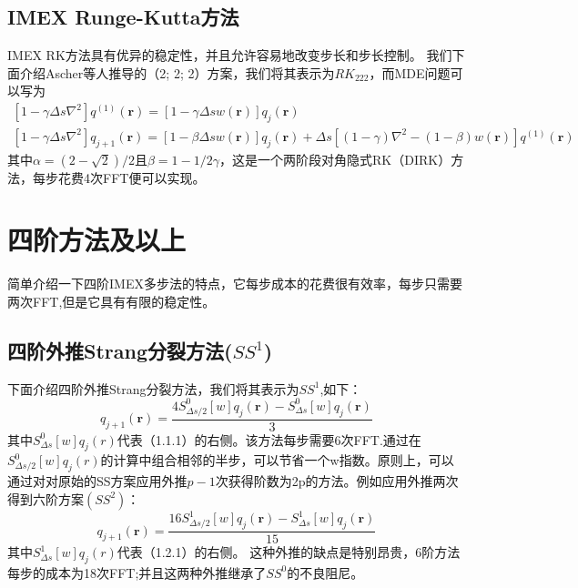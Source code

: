 \subsection{IMEX Runge-Kutta方法}
IMEX RK方法具有优异的稳定性，并且允许容易地改变步长和步长控制。
我们下面介绍Ascher等人推导的（2; 2; 2）方案，我们将其表示为$RK_{222}$，而MDE问题可以写为
\begin{equation}
\begin{array}{l}{\left[1-\gamma \Delta s \nabla^{2}\right] q^{(1)}(\mathbf{r})=[1-\gamma \Delta s w(\mathbf{r})] q_{j}(\mathbf{r})} \\ {\left[1-\gamma \Delta s \nabla^{2}\right] q_{j+1}(\mathbf{r})=[1-\beta \Delta s w(\mathbf{r})] q_{j}(\mathbf{r})+\Delta s\left[(1-\gamma) \nabla^{2}-(1-\beta) w(\mathbf{r})\right] q^{(1)}(\mathbf{r})}\end{array}
\end{equation}
其中$\alpha=(2-\sqrt{2})/2$且$\beta=1-1/2\gamma$，这是一个两阶段对角隐式RK（DIRK）方法，每步花费4次FFT便可以实现。



\section{四阶方法及以上}
简单介绍一下四阶IMEX多步法的特点，它每步成本的花费很有效率，每步只需要两次FFT,但是它具有有限的稳定性。

\subsection{四阶外推Strang分裂方法($SS^1$)}
下面介绍四阶外推Strang分裂方法，我们将其表示为$SS^1$,如下：
\begin{equation}
q_{j+1}(\mathbf{r})=\frac{4 S_{\Delta s / 2}^{0}[w] q_{j}(\mathbf{r})-S_{\Delta s}^{0}[w] q_{j}(\mathbf{r})}{3}
\end{equation}
其中$S_{\Delta s}^0[w]q_{j}(r)$代表（1.1.1）的右侧。该方法每步需要6次FFT.通过在$S_{\Delta s/2}^0[w]q_{j}(r)$的计算中组合相邻的半步，可以节省一个w指数。原则上，可以通过对对原始的SS方案应用外推$p-1$次获得阶数为2p的方法。例如应用外推两次得到六阶方案$(SS^2)$：
\begin{equation}
q_{j+1}(\mathbf{r})=\frac{16 S_{\Delta s / 2}^{1}[w] q_{j}(\mathbf{r})-S_{\Delta s}^{1}[w] q_{j}(\mathbf{r})}{15}
\end{equation}
其中$S_{\Delta s}^1[w]q_{j}(r)$代表（1.2.1）的右侧。
这种外推的缺点是特别昂贵，6阶方法每步的成本为18次FFT;并且这两种外推继承了$SS^0$的不良阻尼。



